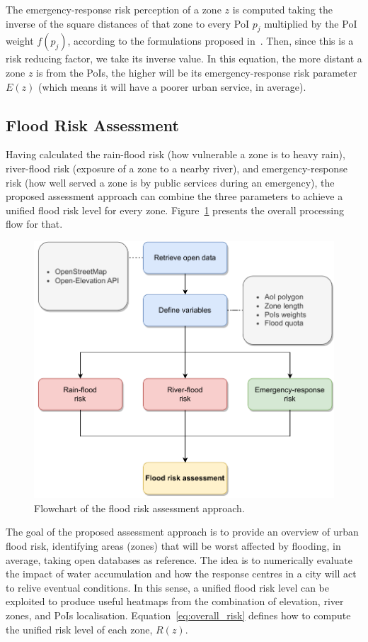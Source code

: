 \begin{refsection}
The emergency-response risk perception of a zone $z$ is computed taking the inverse of the square distances of that zone to every PoI $p_j$ multiplied by the PoI weight $f(p_j)$, according to the formulations proposed in~\cite{sensorsposition,cityzones}. Then, since this is a risk reducing factor, we take its inverse value. In this equation, the more distant a zone $z$ is from the PoIs, the higher will be its emergency-response risk parameter $E(z)$ (which means it will have a poorer urban service, in average).

\subsection{Flood Risk Assessment}

Having calculated the rain-flood risk (how vulnerable a zone is to heavy rain), river-flood risk (exposure of a zone to a nearby river), and emergency-response risk (how well served a zone is by public services during an emergency), the proposed assessment approach can combine the three parameters to achieve a unified flood risk level for every zone. Figure~\ref{fig:assessment_flow} presents the overall processing flow for that. 

\begin{figure}[h]
    \centering
    \includegraphics[width=0.85\linewidth]{Chapters/6-Flood/figs/assessment_flow.pdf}
    \caption{Flowchart of the flood risk assessment approach.}
    \label{fig:assessment_flow}
\end{figure}

The goal of the proposed assessment approach is to provide an overview of urban flood risk, identifying areas (zones) that will be worst affected by flooding, in average, taking open databases as reference. The idea is to numerically evaluate the impact of water accumulation and how the response centres in a city will act to relive eventual conditions. In this sense, a unified flood risk level can be exploited to produce useful heatmaps from the combination of elevation, river zones, and PoIs localisation. Equation~\ref{eq:overall_risk} defines how to compute the unified risk level of each zone, $R(z)$.


\end{refsection}
